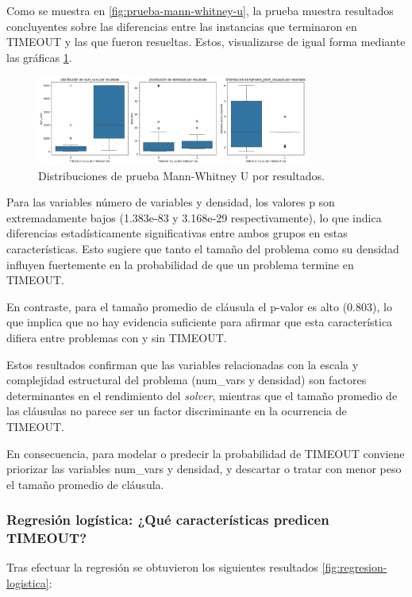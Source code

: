Como se muestra en \ref{fig:prueba-mann-whitney-u}, la prueba muestra resultados concluyentes sobre las diferencias entre las instancias que terminaron en TIMEOUT y las que fueron resueltas. Estos, visualizarse de igual forma mediante las gr\'aficas \ref{fig:dist-man-whitney}.


\begin{figure}[ht]
    \centering
    \includegraphics[width=0.8\textwidth]{Graphics/man_whitney.png}
    \caption{Distribuciones de prueba Mann-Whitney U por resultados.}
    \label{fig:dist-man-whitney}
\end{figure}

Para las variables n\'umero de variables y densidad, los valores p son extremadamente bajos (1.383e-83 y 3.168e-29 respectivamente), lo que indica diferencias estadísticamente significativas entre ambos grupos en estas características. Esto sugiere que tanto el tamaño del problema como su densidad influyen fuertemente en la probabilidad de que un problema termine en TIMEOUT.

En contraste, para el tamaño promedio de cláusula el p-valor es alto (0.803), lo que implica que no hay evidencia suficiente para afirmar que esta característica difiera entre problemas con y sin TIMEOUT.

Estos resultados confirman que las variables relacionadas con la escala y complejidad estructural del problema (num\_vars y densidad) son factores determinantes en el rendimiento del \textit{solver}, mientras que el tamaño promedio de las cl\'ausulas no parece ser un factor discriminante en la ocurrencia de TIMEOUT.

En consecuencia, para modelar o predecir la probabilidad de TIMEOUT conviene priorizar las variables num\_vars y densidad, y descartar o tratar con menor peso el tamaño promedio de cláusula.

\subsubsection{Regresi\'on log\'istica: ¿Qué caracter\'isticas predicen TIMEOUT?}

Tras efectuar la regresi\'on se obtuvieron los siguientes resultados \ref{fig:regresion-logistica}:

